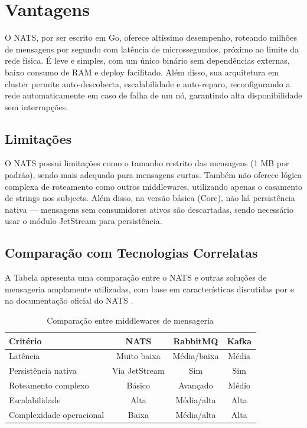 
\section{Vantagens}
O NATS, por ser escrito em Go, oferece altíssimo desempenho, roteando milhões de mensagens por segundo com latência de microssegundos, próximo ao limite da rede física. É leve e simples, com um único binário sem dependências externas, baixo consumo de RAM e deploy facilitado. Além disso, sua arquitetura em cluster permite auto-descoberta, escalabilidade e auto-reparo, reconfigurando a rede automaticamente em caso de falha de um nó, garantindo alta disponibilidade sem interrupções.

\subsection{Limitações}
O NATS possui limitações como o tamanho restrito das mensagens (1 MB por padrão), sendo mais adequado para mensagens curtas. Também não oferece lógica complexa de roteamento como outros middlewares, utilizando apenas o casamento de strings nos subjects. Além disso, na versão básica (Core), não há persistência nativa — mensagens sem consumidores ativos são descartadas, sendo necessário usar o módulo JetStream para persistência.

\subsection{Comparação com Tecnologias Correlatas}
A Tabela apresenta uma comparação entre o NATS e outras soluções de mensageria amplamente utilizadas, com base em características discutidas por \cite{sharvari2019messaging} e na documentação oficial do NATS \cite{nats_compare}.
\begin{table}[H]
\centering
\caption{Comparação entre middlewares de mensageria}
\begin{tabular}{|l|c|c|c|}
\hline
\textbf{Critério} & \textbf{NATS} & \textbf{RabbitMQ} & \textbf{Kafka} \\ \hline
Latência & Muito baixa & Média/baixa & Média \\ \hline
Persistência nativa & Via JetStream & Sim & Sim \\ \hline
Roteamento complexo & Básico & Avançado & Médio \\ \hline
Escalabilidade & Alta & Média/alta & Alta \\ \hline
Complexidade operacional & Baixa & Média/alta & Alta \\ \hline
\end{tabular}
\label{tab:comparacao_middlewares}
\end{table}

